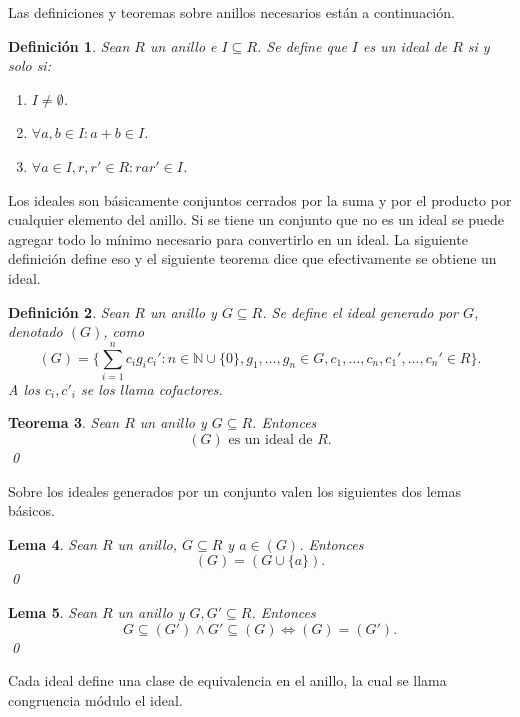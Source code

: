 \documentclass[12pt]{report}
\theoremstyle{customstyle}
\newtheorem{theorem}{Teorema}[chapter]
\newtheorem{definition}[theorem]{Definición}
\newtheorem{lemma}[theorem]{Lema}
\theoremstyle{factstyle}
\begin{document}
Las definiciones y teoremas sobre anillos necesarios están a continuación.

\begin{definition}\label{def:ideal}
  Sean $R$ un anillo e $I ⊆ R$. Se define que $I$ es un ideal de $R$ si y solo si:
  \begin{enumerate}
    \item $I ≠ ∅$.
    \item $∀a, b ∈ I : a + b ∈ I$.
    \item $∀a ∈ I, r, r' ∈ R : r a r' ∈ I$.
  \end{enumerate}
\end{definition}

Los ideales son básicamente conjuntos cerrados por la suma y por el producto por cualquier elemento del anillo. Si se tiene un conjunto que no es un ideal se puede agregar todo lo mínimo necesario para convertirlo en un ideal. La siguiente definición define eso y el siguiente teorema dice que efectivamente se obtiene un ideal.

\begin{definition}\label{def:ideal gen}
  Sean $R$ un anillo y $G ⊆ R$. Se define el ideal generado por $G$, denotado $(G)$, como
  \[ (G) = \{∑_{i = 1}^n c_i g_i c_i' : n ∈ ℕ ∪ \{0\}, g_1, …, g_n ∈ G, c_1, …, c_n, c_1', …, c_n' ∈ R\} \text{.}\]
  A los $c_i, c'_i$ se los llama cofactores. %
\end{definition}

\begin{theorem}
  Sean $R$ un anillo y $G ⊆ R$. Entonces
  \[ (G)\text{ es un ideal de }R \text{.}\]
  \qed
\end{theorem}

Sobre los ideales generados por un conjunto valen los siguientes dos lemas básicos.

\begin{lemma}\label{lemma:gen G = gen G U a con a ∈ gen G}
  Sean $R$ un anillo, $G ⊆ R$ y $a ∈ (G)$. Entonces
  \[ (G) = (G ∪ \{a\}) \text{.}\]
  \qed
\end{lemma}

\begin{lemma}\label{lemma:sub gen y sub gen ⇔ eq}
  Sean $R$ un anillo y $G, G' ⊆ R$. Entonces
  \[ G ⊆ (G') ∧ G' ⊆ (G) ⇔ (G) = (G') \text{.}\]
  \qed
\end{lemma}


Cada ideal define una clase de equivalencia en el anillo, la cual se llama congruencia módulo el ideal.
\end{document}
